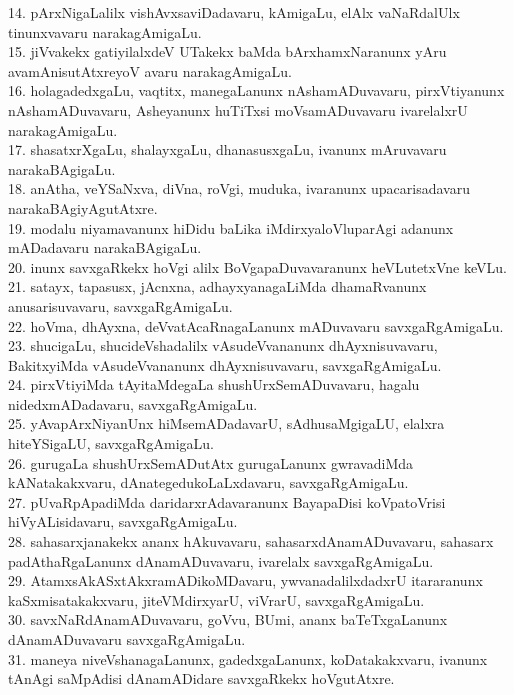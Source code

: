 \documentclass{article}
\begin{document}
14. pArxNigaLalilx vishAvxsaviDadavaru, kAmigaLu, elAlx vaNaRdalUlx tinunxvavaru narakagAmigaLu.\\
15. jiVvakekx gatiyilalxdeV UTakekx baMda bArxhamxNaranunx yAru avamAnisutAtxreyoV avaru narakagAmigaLu.\\
16. holagadedxgaLu, vaqtitx, manegaLanunx nAshamADuvavaru, pirxVtiyanunx nAshamADuvavaru, Asheyanunx huTiTxsi moVsamADuvavaru ivarelalxrU narakagAmigaLu.\\
17. shasatxrXgaLu, shalayxgaLu, dhanasusxgaLu, ivanunx mAruvavaru narakaBAgigaLu.\\
18. anAtha, veYSaNxva, diVna, roVgi, muduka, ivaranunx upacarisadavaru narakaBAgiyAgutAtxre.\\
19. modalu niyamavanunx hiDidu baLika iMdirxyaloVluparAgi adanunx mADadavaru narakaBAgigaLu.\\
20. inunx savxgaRkekx hoVgi alilx BoVgapaDuvavaranunx heVLutetxVne keVLu.\\
21. satayx, tapasusx, jAcnxna, adhayxyanagaLiMda dhamaRvanunx anusarisuvavaru, savxgaRgAmigaLu.\\
22. hoVma, dhAyxna, deVvatAcaRnagaLanunx mADuvavaru savxgaRgAmigaLu.\\
23. shucigaLu, shucideVshadalilx vAsudeVvananunx dhAyxnisuvavaru, BakitxyiMda vAsudeVvananunx dhAyxnisuvavaru, savxgaRgAmigaLu.\\
24. pirxVtiyiMda tAyitaMdegaLa shushUrxSemADuvavaru, hagalu nidedxmADadavaru, savxgaRgAmigaLu.\\
25. yAvapArxNiyanUnx hiMsemADadavarU, sAdhusaMgigaLU, elalxra hiteYSigaLU, savxgaRgAmigaLu.\\
26. gurugaLa shushUrxSemADutAtx gurugaLanunx gwravadiMda kANatakakxvaru, dAnategedukoLaLxdavaru, savxgaRgAmigaLu.\\
27. pUvaRpApadiMda daridarxrAdavaranunx BayapaDisi koVpatoVrisi hiVyALisidavaru, savxgaRgAmigaLu.\\
28. sahasarxjanakekx ananx hAkuvavaru, sahasarxdAnamADuvavaru, sahasarx padAthaRgaLanunx dAnamADuvavaru, ivarelalx savxgaRgAmigaLu.\\
29. AtamxsAkASxtAkxramADikoMDavaru, ywvanadalilxdadxrU itararanunx kaSxmisatakakxvaru, jiteVMdirxyarU, viVrarU, savxgaRgAmigaLu.\\
30. savxNaRdAnamADuvavaru, goVvu, BUmi, ananx baTeTxgaLanunx dAnamADuvavaru savxgaRgAmigaLu.\\
31. maneya niveVshanagaLanunx, gadedxgaLanunx, koDatakakxvaru, ivanunx tAnAgi saMpAdisi dAnamADidare savxgaRkekx hoVgutAtxre.\\
\end{document}
